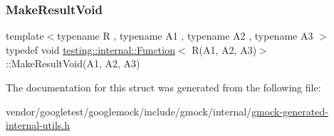 \subsubsection{\texorpdfstring{Make\+Result\+Void}{MakeResultVoid}}
{\footnotesize\ttfamily template$<$typename R , typename A1 , typename A2 , typename A3 $>$ \\
typedef void \hyperlink{structtesting_1_1internal_1_1_function}{testing\+::internal\+::\+Function}$<$ R(A1, A2, A3)$>$\+::Make\+Result\+Void(A1, A2, A3)}



The documentation for this struct was generated from the following file\+:\begin{DoxyCompactItemize}
\item 
vendor/googletest/googlemock/include/gmock/internal/\hyperlink{gmock-generated-internal-utils_8h}{gmock-\/generated-\/internal-\/utils.\+h}\end{DoxyCompactItemize}
